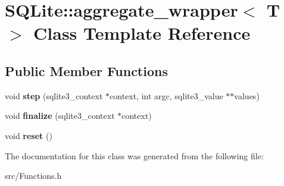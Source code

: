 \hypertarget{class_s_q_lite_1_1aggregate__wrapper}{\section{S\-Q\-Lite\-:\-:aggregate\-\_\-wrapper$<$ T $>$ Class Template Reference}
\label{class_s_q_lite_1_1aggregate__wrapper}
}
\subsection*{Public Member Functions}
\begin{DoxyCompactItemize}
\item 
\hypertarget{class_s_q_lite_1_1aggregate__wrapper_afa2234420d5123fb9c2f32cdeb141d5c}{void {\bfseries step} (sqlite3\-\_\-context $\ast$context, int argc, sqlite3\-\_\-value $\ast$$\ast$values)}\label{class_s_q_lite_1_1aggregate__wrapper_afa2234420d5123fb9c2f32cdeb141d5c}

\item 
\hypertarget{class_s_q_lite_1_1aggregate__wrapper_a81833a66bb5aff5c6a6721c5d4e922ab}{void {\bfseries finalize} (sqlite3\-\_\-context $\ast$context)}\label{class_s_q_lite_1_1aggregate__wrapper_a81833a66bb5aff5c6a6721c5d4e922ab}

\item 
\hypertarget{class_s_q_lite_1_1aggregate__wrapper_a42dfb0198b091c777f066ce1c4e04f2e}{void {\bfseries reset} ()}\label{class_s_q_lite_1_1aggregate__wrapper_a42dfb0198b091c777f066ce1c4e04f2e}

\end{DoxyCompactItemize}


The documentation for this class was generated from the following file\-:\begin{DoxyCompactItemize}
\item 
src/Functions.\-h\end{DoxyCompactItemize}
